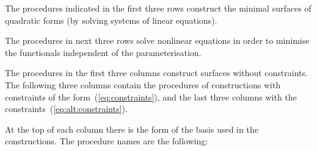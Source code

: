 \vspace{\bigskipamount}
The procedures indicated in the first three rows construct the minimal
surfaces of quadratic forms (by solving systems of linear equations).

The procedures in next three rows solve nonlinear equations in order to
minimise the functionals independent of the parameterisation.

The procedures in the first three columns construct surfaces without
constraints. The following three columns contain the procedures of constructions
with constraints of the form~(\ref{eq:constraints}), and the last three columns
with the constraints~(\ref{eq:alt:constraints}).

At the top of each column there is the form of the basis used in the constructions.
The procedure names are the following:

